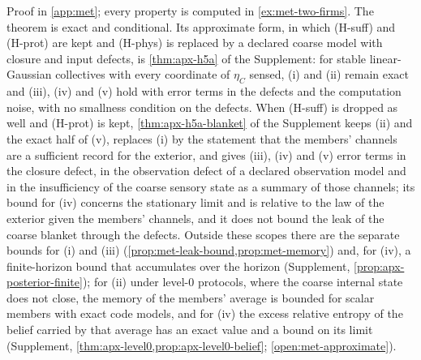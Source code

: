 Proof in \cref{app:met}; every property is computed in \cref{ex:met-two-firms}. The theorem is exact and conditional. Its approximate form, in which (H-suff) and (H-prot) are kept and (H-phys) is replaced by a declared coarse model with closure and input defects, is \cref{thm:apx-h5a} of the Supplement: for stable linear-Gaussian collectives with every coordinate of $\eta_C$ sensed, (i) and (ii) remain exact and (iii), (iv) and (v) hold with error terms in the defects and the computation noise, with no smallness condition on the defects. When (H-suff) is dropped as well and (H-prot) is kept, \cref{thm:apx-h5a-blanket} of the Supplement keeps (ii) and the exact half of (v), replaces (i) by the statement that the members' channels are a sufficient record for the exterior, and gives (iii), (iv) and (v) error terms in the closure defect, in the observation defect of a declared observation model and in the insufficiency of the coarse sensory state as a summary of those channels; its bound for (iv) concerns the stationary limit and is relative to the law of the exterior given the members' channels, and it does not bound the leak of the coarse blanket through the defects. Outside these scopes there are the separate bounds for (i) and (iii) (\cref{prop:met-leak-bound,prop:met-memory}) and, for (iv), a finite-horizon bound that accumulates over the horizon (Supplement, \cref{prop:apx-posterior-finite}); for (ii) under level-0 protocols, where the coarse internal state does not close, the memory of the members' average is bounded for scalar members with exact code models, and for (iv) the excess relative entropy of the belief carried by that average has an exact value and a bound on its limit (Supplement, \cref{thm:apx-level0,prop:apx-level0-belief}; \cref{open:met-approximate}).

